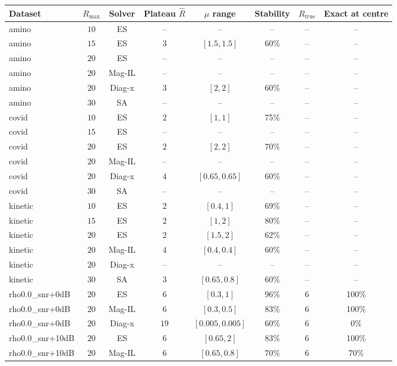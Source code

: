 \begin{longtable}{@{}lccccccc@{}}
\toprule
Dataset & \(R_{\max}\) & Solver & Plateau \(\hat R\) & \(\mu\) range & Stability & \(R_{\mathrm{true}}\) & Exact at centre \\
\midrule
\endhead
amino & \(10\) & ES & -- & -- & -- & -- & -- \\
amino & \(15\) & ES & \(3\) & \([1.5, 1.5]\) & 60\% & -- & -- \\
amino & \(20\) & ES & -- & -- & -- & -- & -- \\
amino & \(20\) & Mag-IL & -- & -- & -- & -- & -- \\
amino & \(20\) & Diag-x & \(3\) & \([2, 2]\) & 60\% & -- & -- \\
amino & \(30\) & SA & -- & -- & -- & -- & -- \\
covid & \(10\) & ES & \(2\) & \([1, 1]\) & 75\% & -- & -- \\
covid & \(15\) & ES & -- & -- & -- & -- & -- \\
covid & \(20\) & ES & \(2\) & \([2, 2]\) & 70\% & -- & -- \\
covid & \(20\) & Mag-IL & -- & -- & -- & -- & -- \\
covid & \(20\) & Diag-x & \(4\) & \([0.65, 0.65]\) & 60\% & -- & -- \\
covid & \(30\) & SA & -- & -- & -- & -- & -- \\
kinetic & \(10\) & ES & \(2\) & \([0.4, 1]\) & 69\% & -- & -- \\
kinetic & \(15\) & ES & \(2\) & \([1, 2]\) & 80\% & -- & -- \\
kinetic & \(20\) & ES & \(2\) & \([1.5, 2]\) & 62\% & -- & -- \\
kinetic & \(20\) & Mag-IL & \(4\) & \([0.4, 0.4]\) & 60\% & -- & -- \\
kinetic & \(20\) & Diag-x & -- & -- & -- & -- & -- \\
kinetic & \(30\) & SA & \(3\) & \([0.65, 0.8]\) & 60\% & -- & -- \\
rho0.0\_snr+0dB & \(20\) & ES & \(6\) & \([0.3, 1]\) & 96\% & \(6\) & 100\% \\
rho0.0\_snr+0dB & \(20\) & Mag-IL & \(6\) & \([0.3, 0.5]\) & 83\% & \(6\) & 100\% \\
rho0.0\_snr+0dB & \(20\) & Diag-x & \(19\) & \([0.005, 0.005]\) & 60\% & \(6\) & 0\% \\
rho0.0\_snr+10dB & \(20\) & ES & \(6\) & \([0.65, 2]\) & 83\% & \(6\) & 100\% \\
rho0.0\_snr+10dB & \(20\) & Mag-IL & \(6\) & \([0.65, 0.8]\) & 70\% & \(6\) & 70\% \\

\end{longtable}
